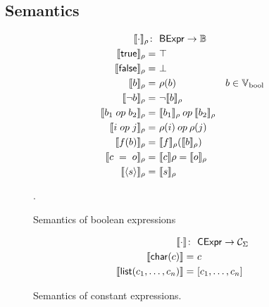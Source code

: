 \subsection{Semantics}


\begin{figure}[h]
    \centering
    \begin{align*}
        \llbracket  \cdot  \rrbracket_{\rho}               \colon&~ \mathsf{BExpr} \to \mathbb{B} \\
        \llbracket \mathsf{true} \rrbracket_{\rho}               =&~ \top \\
        \llbracket \mathsf{false} \rrbracket_{\rho}              =&~ \bot \\
        \llbracket b \rrbracket_{\rho}                    =&~ \rho(b) & b \in \mathbb{V}_{\text{bool}} \\
        \llbracket \neg b \rrbracket_{\rho}             =&~ \neg \llbracket b \rrbracket_{\rho} \\
        \llbracket b_1 \; op \; b_2 \rrbracket_{\rho}  =&~ \llbracket b_1 \rrbracket_{\rho} \mathbin{op} \llbracket b_2 \rrbracket_{\rho} \\
        \llbracket i \; op \; j \rrbracket_{\rho}     =&~ \rho(i) \mathbin{op} \rho(j) \\
        \llbracket \mathop{f}(b) \rrbracket_{\rho}          =&~ \llbracket f \rrbracket_{\rho}(\llbracket b \rrbracket_{\rho}) \\
        \llbracket c \; = \; o \rrbracket_{\rho}        =&~ \llbracket c \rrbracket{\rho} = \llbracket o \rrbracket_{\rho} \\
        \llbracket \langle s \rangle \rrbracket_{\rho}             =&~ \llbracket s \rrbracket_{\rho}
    \end{align*}
    \caption{Semantics of boolean expressions}.
\end{figure}

\begin{figure}
    \centering
    \begin{align*}
        \semC{ \cdot }                  \colon&~ \cexpr \to \OutputType \\
        \semC{\cchar{c}}                =&~ c \\
        \semC{\clist{c_1, \ldots, c_n}} =&~ [c_1, \ldots, c_n]
    \end{align*}
    \caption{Semantics of constant expressions.}
\end{figure}

